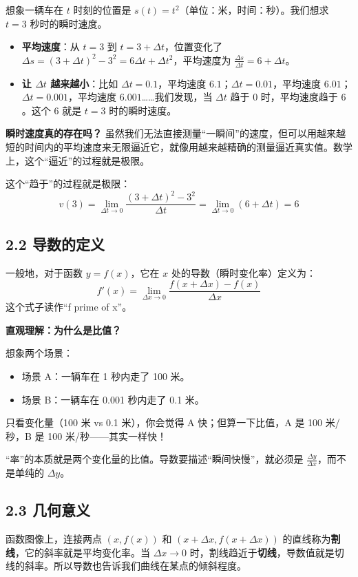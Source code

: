 \documentclass[10pt]{article}
\begin{document}
想象一辆车在 $t$ 时刻的位置是 $s(t)=t^2$（单位：米，时间：秒）。我们想求 $t=3$ 秒时的瞬时速度。

\begin{itemize}
    \item \textbf{平均速度}：从 $t=3$ 到 $t=3+\Delta t$，位置变化了 $\Delta s = (3+\Delta t)^2 - 3^2 = 6\Delta t + \Delta t^2$，平均速度为 $\frac{\Delta s}{\Delta t} = 6 + \Delta t$。
    \item \textbf{让 $\Delta t$ 越来越小}：比如 $\Delta t=0.1$，平均速度 $6.1$；$\Delta t=0.01$，平均速度 $6.01$；$\Delta t=0.001$，平均速度 $6.001$……我们发现，当 $\Delta t$ 趋于 0 时，平均速度趋于 $6$。这个 $6$ 就是 $t=3$ 时的瞬时速度。
\end{itemize}

\textbf{瞬时速度真的存在吗？} 虽然我们无法直接测量“一瞬间”的速度，但可以用越来越短的时间内的平均速度来无限逼近它，就像用越来越精确的测量逼近真实值。数学上，这个“逼近”的过程就是极限。

这个“趋于”的过程就是极限：
\[
v(3) = \lim_{\Delta t \to 0} \frac{(3+\Delta t)^2 - 3^2}{\Delta t} = \lim_{\Delta t \to 0} (6 + \Delta t) = 6
\]

\subsection*{2.2 导数的定义}

一般地，对于函数 $y=f(x)$，它在 $x$ 处的导数（瞬时变化率）定义为：
\[
f'(x) = \lim_{\Delta x \to 0} \frac{f(x+\Delta x) - f(x)}{\Delta x}
\]
这个式子读作“f prime of x”。

\textbf{直观理解：为什么是比值？}

想象两个场景：
\begin{itemize}
    \item 场景 A：一辆车在 1 秒内走了 100 米。
    \item 场景 B：一辆车在 0.001 秒内走了 0.1 米。
\end{itemize}
只看变化量（100 米 vs 0.1 米），你会觉得 A 快；但算一下比值，A 是 100 米/秒，B 是 100 米/秒——其实一样快！

“率”的本质就是两个变化量的比值。导数要描述“瞬间快慢”，就必须是 $\frac{\Delta y}{\Delta x}$，而不是单纯的 $\Delta y$。

\subsection*{2.3 几何意义}

函数图像上，连接两点 $(x, f(x))$ 和 $(x+\Delta x, f(x+\Delta x))$ 的直线称为\textbf{割线}，它的斜率就是平均变化率。当 $\Delta x \to 0$ 时，割线趋近于\textbf{切线}，导数值就是切线的斜率。所以导数也告诉我们曲线在某点的倾斜程度。
\end{document}
